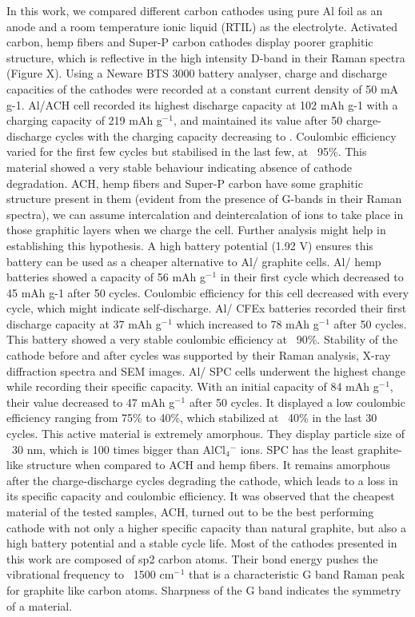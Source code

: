 \documentclass{article}
\begin{document}
In this work, we compared different carbon cathodes using pure Al foil as an anode and a room temperature ionic liquid (RTIL) as the electrolyte. Activated carbon, hemp fibers and Super-P carbon cathodes display poorer graphitic structure, which is reflective in the high intensity D-band in their Raman spectra (Figure X). Using a Neware BTS 3000 battery analyser, charge and discharge capacities of the cathodes were recorded at a constant current density of 50 mA g-1. Al/ACH cell recorded its highest discharge capacity at 102 mAh g-1 with a charging capacity of 219 mAh g$^-{^1}$, and maintained its value after 50 charge-discharge cycles with the charging capacity decreasing to . Coulombic efficiency varied for the first few cycles but stabilised in the last few, at ~95\%. This material showed a very stable behaviour indicating absence of cathode degradation. ACH, hemp fibers and Super-P carbon have some graphitic structure present in them (evident from the presence of G-bands in their Raman spectra), we can assume intercalation and deintercalation of ions to take place in those graphitic layers when we charge the cell. Further analysis might help in establishing this hypothesis. A high battery potential (1.92 V) ensures this battery can be used as a cheaper alternative to Al/ graphite cells.  Al/ hemp batteries showed a capacity of 56 mAh g$^-{^1}$ in their first cycle which decreased to 45 mAh g-1 after 50 cycles. Coulombic efficiency for this cell decreased with every cycle, which might indicate self-discharge. Al/ CFEx batteries recorded their first discharge capacity at 37 mAh g$^-{^1}$ which increased to 78 mAh g$^-{^1}$ after 50 cycles. This battery showed a very stable coulombic efficiency at ~90\%. Stability of the cathode before and after cycles was supported by their Raman analysis, X-ray diffraction spectra and SEM images. Al/ SPC cells underwent the highest change while recording their specific capacity. With an initial capacity of 84 mAh g$^-{^1}$, their value decreased to 47 mAh g$^-{^1}$ after 50 cycles.  It displayed a low coulombic efficiency ranging from 75\% to 40\%, which stabilized at ~40\% in the last 30 cycles. This active material is extremely amorphous. They display particle size of ~30 nm, which is 100 times bigger than AlCl$_4{^-}$ ions. SPC has the least graphite-like structure when compared to ACH and hemp fibers. It remains amorphous after the charge-discharge cycles degrading the cathode, which leads to a loss in its specific capacity and coulombic efficiency. It was observed that the cheapest material of the tested samples, ACH, turned out to be the best performing cathode with not only a higher specific capacity than natural graphite, but also a high battery potential and a stable cycle life. Most of the cathodes presented in this work are composed of sp2 carbon atoms. Their bond energy pushes the vibrational frequency to ~1500 cm$^-{^1}$ that is a characteristic G band Raman peak for graphite like carbon atoms. Sharpness of the G band indicates the symmetry of a material. 
\end{document}
